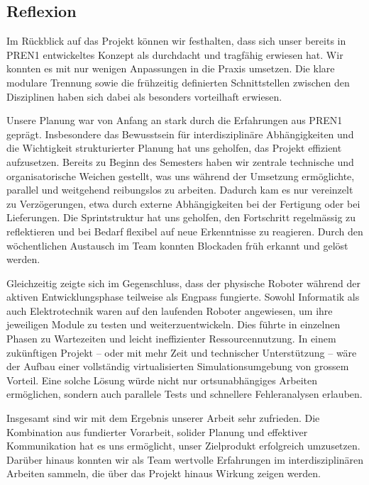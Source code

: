 \documentclass[main.tex]{subfiles} %
\begin{document}

\subsection{Reflexion}

Im Rückblick auf das Projekt können wir festhalten, dass sich unser bereits in PREN1
entwickeltes Konzept als durchdacht und tragfähig erwiesen hat. Wir konnten es mit nur
wenigen Anpassungen in die Praxis umsetzen. Die klare modulare Trennung sowie die frühzeitig definierten Schnittstellen
zwischen den Disziplinen haben sich dabei als besonders vorteilhaft erwiesen.

Unsere Planung war von Anfang an stark durch die Erfahrungen aus PREN1 geprägt.
Insbesondere das Bewusstsein für interdisziplinäre Abhängigkeiten und die Wichtigkeit
strukturierter Planung hat uns geholfen, das Projekt effizient aufzusetzen. Bereits zu
Beginn des Semesters haben wir zentrale technische und organisatorische Weichen gestellt,
was uns während der Umsetzung ermöglichte, parallel und weitgehend reibungslos zu
arbeiten. Dadurch kam es nur vereinzelt zu Verzögerungen, etwa durch externe
Abhängigkeiten bei der Fertigung oder bei Lieferungen. Die Sprintstruktur hat uns 
geholfen, den Fortschritt regelmässig zu reflektieren und bei Bedarf flexibel auf 
neue Erkenntnisse zu reagieren. Durch den wöchentlichen Austausch im
Team konnten Blockaden früh erkannt und gelöst werden. 

Gleichzeitig zeigte sich im Gegenschluss, dass der physische Roboter während der aktiven
Entwicklungsphase teilweise als Engpass fungierte. Sowohl Informatik als auch
Elektrotechnik waren auf den laufenden Roboter angewiesen, um ihre jeweiligen Module zu
testen und weiterzuentwickeln. Dies führte in einzelnen Phasen zu Wartezeiten und leicht
ineffizienter Ressourcennutzung. In einem zukünftigen Projekt – oder mit mehr Zeit und
technischer Unterstützung – wäre der Aufbau einer vollständig virtualisierten
Simulationsumgebung von grossem Vorteil. Eine solche Lösung würde nicht nur
ortsunabhängiges Arbeiten ermöglichen, sondern auch parallele Tests und schnellere
Fehleranalysen erlauben.

Insgesamt sind wir mit dem Ergebnis unserer Arbeit sehr zufrieden. Die Kombination aus
fundierter Vorarbeit, solider Planung und effektiver Kommunikation hat es uns ermöglicht,
unser Zielprodukt erfolgreich umzusetzen. Darüber hinaus konnten wir als Team wertvolle 
Erfahrungen im interdisziplinären Arbeiten sammeln, die über das Projekt hinaus Wirkung 
zeigen werden.
\end{document}
